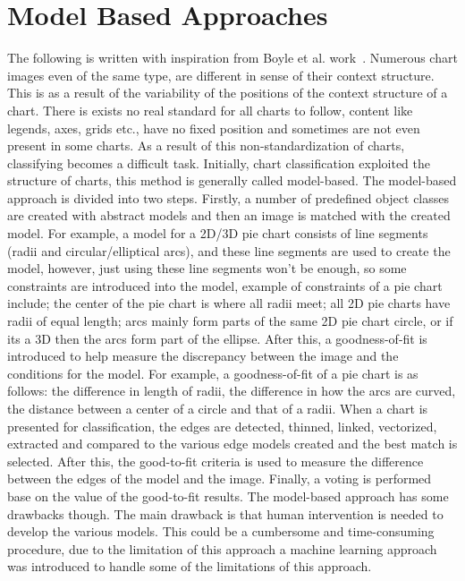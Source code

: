 \documentclass[12pt, a4paper,oneside]{report}
\begin{document}
\section{Model Based Approaches}
The following is written with inspiration from Boyle et al. work~\cite{boyle2007advances}. Numerous chart images even of the same type, are different in sense of their context structure. This is as a result of the variability of the positions of the context structure of a chart. There is exists no real standard for all charts to follow, content like legends, axes, grids etc., have no fixed position and sometimes are not even present in some charts. As a result of this non-standardization of charts, classifying becomes a difficult task. Initially, chart classification exploited the structure of charts, this method is generally called model-based. The model-based approach is divided into two steps. Firstly, a number of predefined object classes are created with abstract models and then an image is matched with the created model. For example, a model for a 2D/3D pie chart consists of line segments (radii and circular/elliptical arcs), and these line segments are used to create the model, however, just using these line segments won't be enough, so some constraints are introduced into the model, example of constraints of a pie chart include; the center of the pie chart is where all radii meet; all 2D pie charts have radii of equal length; arcs mainly form parts of the same 2D pie chart circle, or if its a 3D then the arcs form part of the ellipse. After this, a goodness-of-fit is introduced to help measure the discrepancy between the image and the conditions for the model. For example, a goodness-of-fit of a pie chart is as follows: the difference in length of radii, the difference in how the arcs are curved, the distance between a center of a circle and that of a radii. When a chart is presented for classification, the edges are detected, thinned, linked, vectorized, extracted and compared to the various edge models created and the best match is selected. After this, the good-to-fit criteria is used to measure the difference between the edges of the model and the image. Finally, a voting is performed base on the value of the good-to-fit results. The model-based approach has some drawbacks though. The main drawback is that human intervention is needed to develop the various models. This could be a cumbersome and time-consuming procedure, due to the limitation of this approach a machine learning approach was introduced to handle some of the limitations of this approach.
\end{document}
